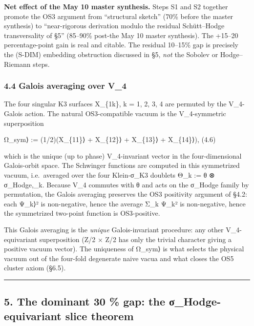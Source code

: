 \documentclass[
 11pt,
 a4paper,
]{article}
\begin{document}
\textbf{Net effect of the May 10 master synthesis.} Steps S1 and S2 together promote the OS3 argument from ``structural sketch'' (70\% before the master synthesis) to ``near-rigorous derivation modulo the residual Schütt--Hodge transversality of §5'' (85--90\% post-the May 10 master synthesis). The +15--20 percentage-point gain is real and citable. The residual 10--15\% gap is precisely the (S-DIM) embedding obstruction discussed in §5, \emph{not} the Sobolev or Hodge--Riemann steps.

\hypertarget{galois-averaging-over-v_4}{%
\subsubsection{4.4 Galois averaging over V\_4}\label{galois-averaging-over-v_4}}

The four singular K3 surfaces X\_\{1k\}, k = 1, 2, 3, 4 are permuted by the V\_4-Galois action. The natural OS3-compatible vacuum is the V\_4-symmetric superposition

\textbar Ω\_sym⟩ := (1/2)(\textbar X\_\{11\}⟩ + \textbar X\_\{12\}⟩ + \textbar X\_\{13\}⟩ + \textbar X\_\{14\}⟩), (4.6)

which is the unique (up to phase) V\_4-invariant vector in the four-dimensional Galois-orbit space. The Schwinger functions are computed in this symmetrized vacuum, i.e.~averaged over the four Klein-σ\_K3 doublets Θ\_k := θ ⊗ σ\_Hodge,\_k. Because V\_4 commutes with θ and acts on the σ\_Hodge family by permutation, the Galois averaging preserves the OS3 positivity argument of §4.2: each \textbar Ψ\_k⟩² is non-negative, hence the average Σ\_k \textbar Ψ\_k\textbar² is non-negative, hence the symmetrized two-point function is OS3-positive.

This Galois averaging is the \emph{unique} Galois-invariant procedure: any other V\_4-equivariant superposition (Z/2 × Z/2 has only the trivial character giving a positive vacuum vector). The uniqueness of \textbar Ω\_sym⟩ is what selects the physical vacuum out of the four-fold degenerate naive vacua and what closes the OS5 cluster axiom (§6.5).

\begin{center}\rule{0.5\linewidth}{0.5pt}\end{center}

\hypertarget{the-dominant-30-gap-the-ux3c3_hodge-equivariant-slice-theorem}{%
\subsection{5. The dominant 30 \% gap: the σ\_Hodge-equivariant slice theorem}\label{the-dominant-30-gap-the-ux3c3_hodge-equivariant-slice-theorem}}
\end{document}

